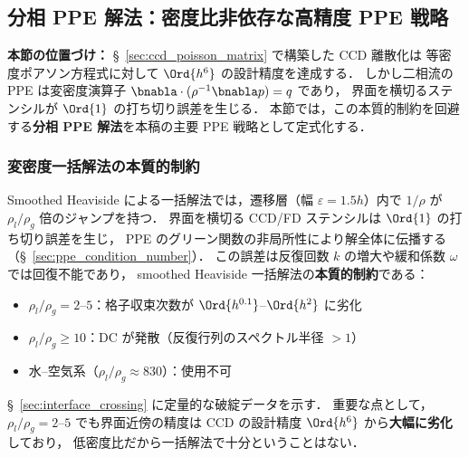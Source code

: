 %
\subsection{分相 PPE 解法：密度比非依存な高精度 PPE 戦略}
\label{sec:split_ppe_framework}
\label{sec:split_ppe_motivation}%
\label{sec:gfm_numerical_motivation}%

\noindent\textbf{本節の位置づけ：}
§~\ref{sec:ccd_poisson_matrix} で構築した CCD 離散化は
等密度ポアソン方程式に対して $\Ord{h^6}$ の設計精度を達成する．
しかし二相流の PPE は変密度演算子 $\bnabla\cdot(\rho^{-1}\bnabla p) = q$ であり，
界面を横切るステンシルが $\Ord{1}$ の打ち切り誤差を生じる．
本節では，この本質的制約を回避する\textbf{分相 PPE 解法}を本稿の主要 PPE 戦略として定式化する．

\subsubsection{変密度一括解法の本質的制約}
\label{sec:monolithic_ppe_limitation}

Smoothed Heaviside による一括解法では，遷移層（幅 $\varepsilon = 1.5h$）内で
$1/\rho$ が $\rho_l/\rho_g$ 倍のジャンプを持つ．
界面を横切る CCD/FD ステンシルは $\Ord{1}$ の打ち切り誤差を生じ，
PPE のグリーン関数の非局所性により解全体に伝播する
（§~\ref{sec:ppe_condition_number}）．
この誤差は反復回数 $k$ の増大や緩和係数 $\omega$ では回復不能であり，
smoothed Heaviside 一括解法の\textbf{本質的制約}である：
%
\begin{itemize}[noitemsep]
  \item $\rho_l/\rho_g = 2$--$5$：格子収束次数が $\Ord{h^{0.1}}$--$\Ord{h^{2}}$ に劣化
  \item $\rho_l/\rho_g \geq 10$：DC が発散（反復行列のスペクトル半径 $> 1$）
  \item 水--空気系（$\rho_l/\rho_g \approx 830$）：使用不可
\end{itemize}
%
§~\ref{sec:interface_crossing} に定量的な破綻データを示す．
重要な点として，$\rho_l/\rho_g = 2$--$5$ でも界面近傍の精度は
CCD の設計精度 $\Ord{h^6}$ から\textbf{大幅に劣化}しており，
低密度比だから一括解法で十分ということはない．

